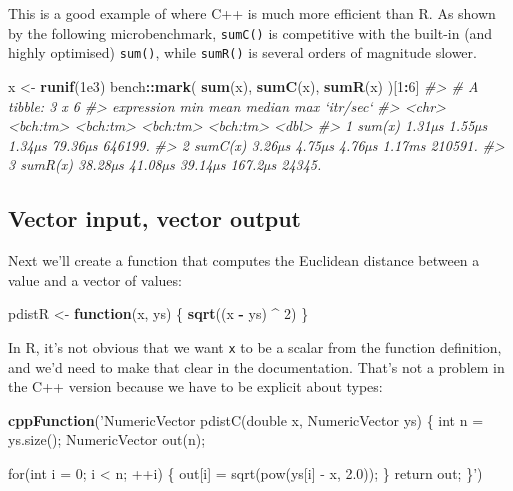 \documentclass[]{book}
\newenvironment{Shaded}{\begin{snugshade}}{\end{snugshade}}
\newcommand{\CommentTok}[1]{\textcolor[rgb]{0.37,0.37,0.37}{\textit{#1}}}
\newcommand{\ControlFlowTok}[1]{\textcolor[rgb]{0.27,0.27,0.27}{\textbf{#1}}}
\newcommand{\DecValTok}[1]{\textcolor[rgb]{0.06,0.06,0.06}{#1}}
\newcommand{\FloatTok}[1]{\textcolor[rgb]{0.06,0.06,0.06}{#1}}
\newcommand{\KeywordTok}[1]{\textcolor[rgb]{0.27,0.27,0.27}{\textbf{#1}}}
\newcommand{\NormalTok}[1]{#1}
\newcommand{\OperatorTok}[1]{\textcolor[rgb]{0.43,0.43,0.43}{\textbf{#1}}}
\newcommand{\StringTok}[1]{\textcolor[rgb]{0.5,0.5,0.5}{#1}}
\begin{document}
This is a good example of where C++ is much more efficient than R. As shown by the following microbenchmark, \texttt{sumC()} is competitive with the built-in (and highly optimised) \texttt{sum()}, while \texttt{sumR()} is several orders of magnitude slower.

\begin{Shaded}
\begin{Highlighting}[]
\NormalTok{x <-}\StringTok{ }\KeywordTok{runif}\NormalTok{(}\FloatTok{1e3}\NormalTok{)}
\NormalTok{bench}\OperatorTok{::}\KeywordTok{mark}\NormalTok{(}
  \KeywordTok{sum}\NormalTok{(x),}
  \KeywordTok{sumC}\NormalTok{(x),}
  \KeywordTok{sumR}\NormalTok{(x)}
\NormalTok{)[}\DecValTok{1}\OperatorTok{:}\DecValTok{6}\NormalTok{]}
\CommentTok{#> # A tibble: 3 x 6}
\CommentTok{#>   expression      min     mean   median      max `itr/sec`}
\CommentTok{#>   <chr>      <bch:tm> <bch:tm> <bch:tm> <bch:tm>     <dbl>}
\CommentTok{#> 1 sum(x)       1.31µs   1.55µs   1.34µs  79.36µs   646199.}
\CommentTok{#> 2 sumC(x)      3.26µs   4.75µs   4.76µs   1.17ms   210591.}
\CommentTok{#> 3 sumR(x)     38.28µs  41.08µs  39.14µs  167.2µs    24345.}
\end{Highlighting}
\end{Shaded}

\hypertarget{vector-input-vector-output}{%
\subsection{Vector input, vector output}\label{vector-input-vector-output}}

Next we'll create a function that computes the Euclidean distance between a value and a vector of values:

\begin{Shaded}
\begin{Highlighting}[]
\NormalTok{pdistR <-}\StringTok{ }\ControlFlowTok{function}\NormalTok{(x, ys) \{}
  \KeywordTok{sqrt}\NormalTok{((x }\OperatorTok{-}\StringTok{ }\NormalTok{ys) }\OperatorTok{^}\StringTok{ }\DecValTok{2}\NormalTok{)}
\NormalTok{\}}
\end{Highlighting}
\end{Shaded}

In R, it's not obvious that we want \texttt{x} to be a scalar from the function definition, and we'd need to make that clear in the documentation. That's not a problem in the C++ version because we have to be explicit about types:

\begin{Shaded}
\begin{Highlighting}[]
\KeywordTok{cppFunction}\NormalTok{(}\StringTok{'NumericVector pdistC(double x, NumericVector ys) \{}
\StringTok{  int n = ys.size();}
\StringTok{  NumericVector out(n);}

\StringTok{  for(int i = 0; i < n; ++i) \{}
\StringTok{    out[i] = sqrt(pow(ys[i] - x, 2.0));}
\StringTok{  \}}
\StringTok{  return out;}
\StringTok{\}'}\NormalTok{)}
\end{Highlighting}
\end{Shaded}
\end{document}
